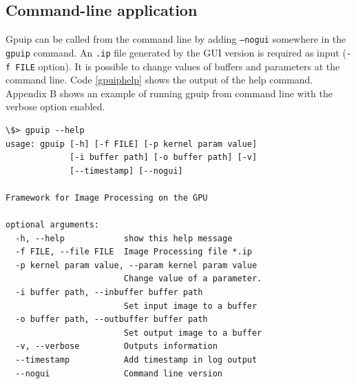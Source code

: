 \newpage
\subsection{Command-line application}

Gpuip can be called from the command line by adding {\tt --nogui} somewhere in the {\tt gpuip} command. An {\tt .ip} file generated by the GUI version is required as input ({\tt -f FILE} option). It is possible to change values of buffers and parameters at the command line. Code \ref{gpuiphelp} shows the output of the help command. Appendix B shows an example of running gpuip from command line with the verbose option enabled.
\newline
\renewcommand{\lstlistingname}{Code}
\begin{lstlisting}[caption= gpuip command-line application, label=gpuiphelp]
\$> gpuip --help
usage: gpuip [-h] [-f FILE] [-p kernel param value] 
             [-i buffer path] [-o buffer path] [-v] 
             [--timestamp] [--nogui]

Framework for Image Processing on the GPU

optional arguments:
  -h, --help            show this help message
  -f FILE, --file FILE  Image Processing file *.ip
  -p kernel param value, --param kernel param value
                        Change value of a parameter.
  -i buffer path, --inbuffer buffer path
                        Set input image to a buffer
  -o buffer path, --outbuffer buffer path
                        Set output image to a buffer
  -v, --verbose         Outputs information
  --timestamp           Add timestamp in log output
  --nogui               Command line version
\end{lstlisting}




